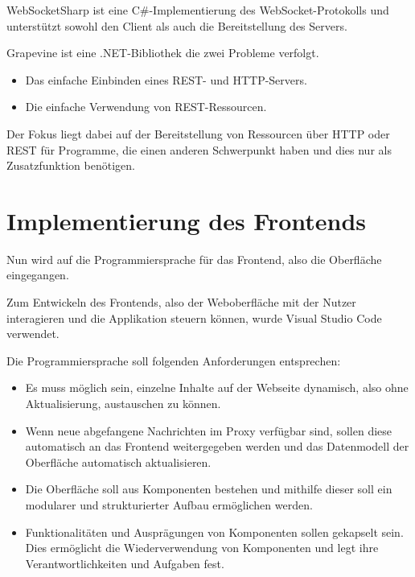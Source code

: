     WebSocketSharp ist eine C\#-Implementierung des WebSocket-Protokolls und unterstützt sowohl den Client als auch die Bereitstellung des Servers.
    
    Grapevine ist eine .NET-Bibliothek die zwei Probleme verfolgt.
    \begin{itemize}
        \item Das einfache Einbinden eines REST- und HTTP-Servers.
        \item Die einfache Verwendung von REST-Ressourcen.
    \end{itemize}
    Der Fokus liegt dabei auf der Bereitstellung von Ressourcen über HTTP oder REST für Programme, die einen anderen Schwerpunkt haben und dies nur als Zusatzfunktion benötigen.
    
\section{Implementierung des Frontends}
    
    Nun wird auf die Programmiersprache für das Frontend, also die Oberfläche eingegangen.
    
    Zum Entwickeln des Frontends, also der Weboberfläche mit der Nutzer interagieren und die Applikation steuern können, wurde Visual Studio Code \cite{microsoft_2016} verwendet.
    
Die Programmiersprache soll folgenden Anforderungen entsprechen:
    \begin{itemize}
        \item Es muss möglich sein, einzelne Inhalte auf der Webseite dynamisch, also ohne Aktualisierung, austauschen zu können.
        \item Wenn neue abgefangene Nachrichten im Proxy verfügbar sind, sollen diese automatisch an das Frontend weitergegeben werden und das Datenmodell der Oberfläche automatisch aktualisieren.
        \item Die Oberfläche soll aus Komponenten bestehen und mithilfe dieser soll ein modularer und strukturierter Aufbau ermöglichen werden.
        \item Funktionalitäten und Ausprägungen von Komponenten sollen gekapselt sein. Dies ermöglicht die Wiederverwendung von Komponenten und legt ihre Verantwortlichkeiten und Aufgaben fest.
    \end{itemize}
    
